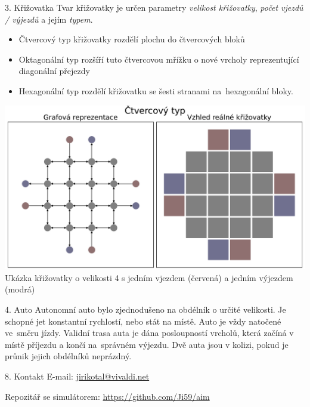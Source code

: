 \documentclass[portrait,fontscale=0.26,paperwidth=842mm,paperheight=1185mm]{baposter.cls}
\begin{document}
\begin{poster}
\begin{posterbox}[column=0, name=krizovatka, below=cile]{3. Křižovatka}
			Tvar křižovatky je určen parametry \textit{velikost křižovatky}, \textit{počet vjezdů / výjezdů} a jejím \textit{typem}.
			\begin{itemize}
				\item Čtvercový typ křižovatky rozdělí plochu do čtvercových bloků
				\item Oktagonální typ rozšíří tuto čtvercovou mřížku o nové vrcholy reprezentující diagonální přejezdy
				\item Hexagonální typ rozdělí křižovatku se šesti stranami na~hexagonální bloky.
			\end{itemize}

			\begin{center}
				\includegraphics[width=\linewidth]{img/Square_grid}
				Ukázka křižovatky o velikosti 4 s jedním vjezdem (červená) a jedním výjezdem (modrá)
			\end{center}
		\end{posterbox}

		\begin{posterbox}[column=0, name=auto, below=krizovatka]{4. Auto}
			Autonomní auto bylo zjednodušeno na obdélník o určité velikosti.
			Je schopné jet konstantní rychlostí, nebo stát na místě.
			Auto je vždy natočené ve~směru jízdy.
			Validní trasa auta je dána posloupností vrcholů, která začíná v místě příjezdu a končí na~správném výjezdu.
			Dvě auta jsou v kolizi, pokud je průnik jejich obdélníků neprázdný.
		\end{posterbox}

		\begin{posterbox}[column=0, name=kontakt, below=auto]{8. Kontakt}
			E-mail: \href{jirikotal@vivaldi.net}{jirikotal@vivaldi.net}

			Repozitář se simulátorem: \href{https://github.com/Ji59/aim}{https://github.com/Ji59/aim}
		\end{posterbox}
%
%
%


\end{poster}
\end{document}
